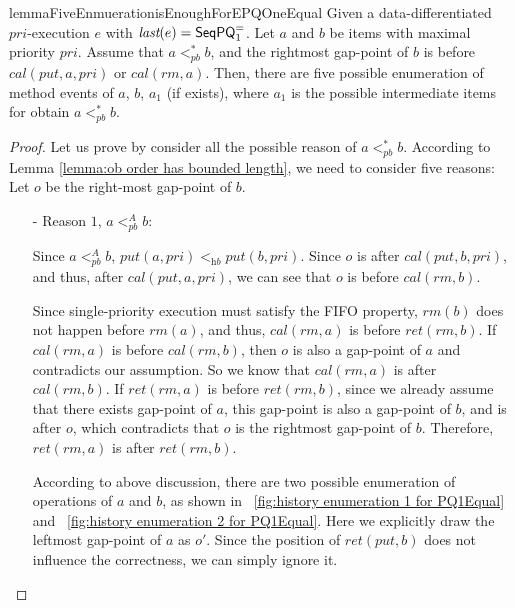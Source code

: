 \begin{restatable}{lemma}{FiveEnmuerationisEnoughForEPQOneEqual}
\label{lemma:five enumeration is enough for EPQ1Equal}
Given a data-differentiated $\textit{pri}$-execution $e$ with $\textit{last}(e) = \mathsf{SeqPQ}_1^{=}$. Let $a$ and $b$ be items with maximal priority $\textit{pri}$. Assume that $a <_{\textit{pb}}^* b$, and the rightmost gap-point of $b$ is before $\textit{cal}(\textit{put},a,\textit{pri})$ or $\textit{cal}(\textit{rm},a)$. Then, there are five possible enumeration of method events of $a$, $b$, $a_1$ (if exists), where $a_1$ is the possible intermediate items for obtain $a <_{\textit{pb}}^* b$.
\end{restatable}
\begin {proof}

Let us prove by consider all the possible reason of $a <_{\textit{pb}}^* b$. According to Lemma \ref{lemma:ob order has bounded length}, we need to consider five reasons: Let $o$ be the right-most gap-point of $b$.

\begin{itemize}
\setlength{\itemsep}{0.5pt}
\item[-] Reason $1$, $a <_{\textit{pb}}^A b$:

    Since $a <_{\textit{pb}}^A b$, $\textit{put}(a,\textit{pri}) <_{\textit{hb}} \textit{put}(b,\textit{pri})$. Since $o$ is after $\textit{cal}(\textit{put},b,\textit{pri})$, and thus, after $\textit{cal}(\textit{put},a,\textit{pri})$, we can see that $o$ is before $\textit{cal}(\textit{rm},b)$.

    Since single-priority execution must satisfy the FIFO property, $\textit{rm}(b)$ does not happen before $\textit{rm}(a)$, and thus, $\textit{cal}(\textit{rm},a)$ is before $\textit{ret}(\textit{rm},b)$. If $\textit{cal}(\textit{rm},a)$ is before $\textit{cal}(\textit{rm},b)$, then $o$ is also a gap-point of $a$ and contradicts our assumption. So we know that $\textit{cal}(\textit{rm},a)$ is after $\textit{cal}(\textit{rm},b)$. If $\textit{ret}(\textit{rm},a)$ is before $\textit{ret}(\textit{rm},b)$, since we already assume that there exists gap-point of $a$, this gap-point is also a gap-point of $b$, and is after $o$, which contradicts that $o$ is the rightmost gap-point of $b$. Therefore, $\textit{ret}(\textit{rm},a)$ is after $\textit{ret}(\textit{rm},b)$.

    According to above discussion, there are two possible enumeration of operations of $a$ and $b$, as shown in \figurename~\ref{fig:history enumeration 1 for PQ1Equal} and \figurename~\ref{fig:history enumeration 2 for PQ1Equal}. Here we explicitly draw the leftmost gap-point of $a$ as $o'$. Since the position of $\textit{ret}(\textit{put},b)$ does not influence the correctness, we can simply ignore it.


\end{itemize}
\end{proof}
